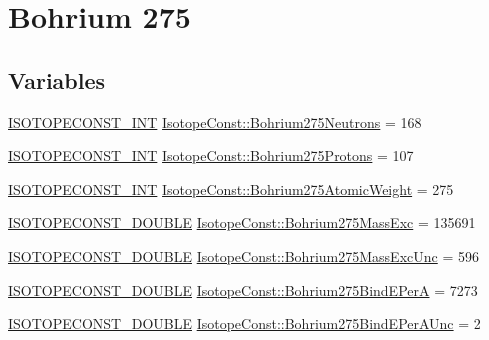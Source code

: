 \hypertarget{group___isotope_const-_bohrium-_bh275}{}\section{Bohrium 275}
\label{group___isotope_const-_bohrium-_bh275}
\subsection*{Variables}
\begin{DoxyCompactItemize}
\item 
\mbox{\hyperlink{group___isotope_const-_macros_ga5f18360b3e99483a35c32d789e62621c}{I\+S\+O\+T\+O\+P\+E\+C\+O\+N\+S\+T\+\_\+\+I\+NT}} \mbox{\hyperlink{group___isotope_const-_bohrium-_bh275_ga32f442d8d688634fde66a7b923caf764}{Isotope\+Const\+::\+Bohrium275\+Neutrons}} = 168
\item 
\mbox{\hyperlink{group___isotope_const-_macros_ga5f18360b3e99483a35c32d789e62621c}{I\+S\+O\+T\+O\+P\+E\+C\+O\+N\+S\+T\+\_\+\+I\+NT}} \mbox{\hyperlink{group___isotope_const-_bohrium-_bh275_gabe0aaf59b2f648704bb1bed6a395b5b4}{Isotope\+Const\+::\+Bohrium275\+Protons}} = 107
\item 
\mbox{\hyperlink{group___isotope_const-_macros_ga5f18360b3e99483a35c32d789e62621c}{I\+S\+O\+T\+O\+P\+E\+C\+O\+N\+S\+T\+\_\+\+I\+NT}} \mbox{\hyperlink{group___isotope_const-_bohrium-_bh275_gacf6603a3ca0844d4d1a4f71946a6395e}{Isotope\+Const\+::\+Bohrium275\+Atomic\+Weight}} = 275
\item 
\mbox{\hyperlink{group___isotope_const-_macros_ga8f45a7272ce02c0b4c65c44636ed719a}{I\+S\+O\+T\+O\+P\+E\+C\+O\+N\+S\+T\+\_\+\+D\+O\+U\+B\+LE}} \mbox{\hyperlink{group___isotope_const-_bohrium-_bh275_gab8ea4b53d594a17a2621b77cdd475628}{Isotope\+Const\+::\+Bohrium275\+Mass\+Exc}} = 135691
\item 
\mbox{\hyperlink{group___isotope_const-_macros_ga8f45a7272ce02c0b4c65c44636ed719a}{I\+S\+O\+T\+O\+P\+E\+C\+O\+N\+S\+T\+\_\+\+D\+O\+U\+B\+LE}} \mbox{\hyperlink{group___isotope_const-_bohrium-_bh275_gad934e1fcf7061c6afb2ab21cb8b68c8e}{Isotope\+Const\+::\+Bohrium275\+Mass\+Exc\+Unc}} = 596
\item 
\mbox{\hyperlink{group___isotope_const-_macros_ga8f45a7272ce02c0b4c65c44636ed719a}{I\+S\+O\+T\+O\+P\+E\+C\+O\+N\+S\+T\+\_\+\+D\+O\+U\+B\+LE}} \mbox{\hyperlink{group___isotope_const-_bohrium-_bh275_ga1a47843812d90dd28df704c1ef9ef354}{Isotope\+Const\+::\+Bohrium275\+Bind\+E\+PerA}} = 7273
\item 
\mbox{\hyperlink{group___isotope_const-_macros_ga8f45a7272ce02c0b4c65c44636ed719a}{I\+S\+O\+T\+O\+P\+E\+C\+O\+N\+S\+T\+\_\+\+D\+O\+U\+B\+LE}} \mbox{\hyperlink{group___isotope_const-_bohrium-_bh275_ga22f01fce58184c03201ce4c2788d1806}{Isotope\+Const\+::\+Bohrium275\+Bind\+E\+Per\+A\+Unc}} = 2

\end{DoxyCompactItemize}
